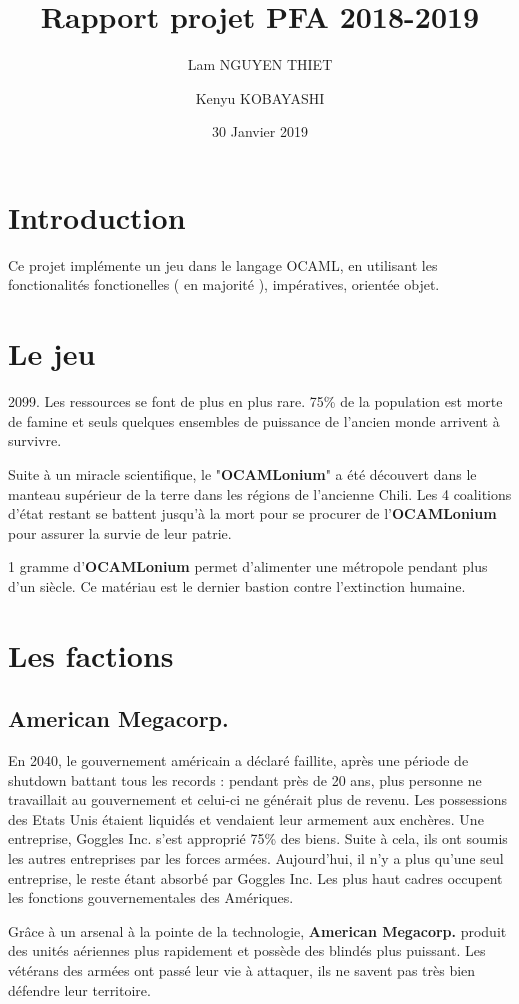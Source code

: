 \documentclass{article}
\title{Rapport projet PFA 2018-2019}
\date{30 Janvier 2019}
\author{Lam NGUYEN THIET
\and Kenyu KOBAYASHI}
\begin{document}
\maketitle
\section{Introduction}
Ce projet implémente un jeu dans le langage OCAML, en utilisant les fonctionalités fonctionelles ( en majorité ), impératives, orientée objet.
\section{Le jeu}
2099. Les ressources se font de plus en plus rare. 75\% de la population est morte de famine et seuls quelques ensembles de puissance de l'ancien monde arrivent
à survivre.

Suite à un miracle scientifique, le "\textbf{OCAMLonium}" a
été découvert dans le manteau supérieur de la terre dans
les régions de l'ancienne Chili. Les 4 coalitions d'état
restant se battent jusqu'à la mort pour se procurer de
l'\textbf{OCAMLonium} pour assurer la survie de leur patrie.

1 gramme d'\textbf{OCAMLonium} permet d'alimenter une métropole pendant plus
d'un siècle. Ce matériau est le dernier bastion contre
l'extinction humaine.

\section{Les factions}
\subsection{American Megacorp.}
En 2040, le gouvernement américain a déclaré faillite, après une période de shutdown battant tous les records : pendant près de 20 ans,
plus personne ne travaillait au gouvernement et celui-ci ne générait plus de revenu. Les possessions des Etats Unis étaient liquidés et vendaient leur armement aux
enchères. Une entreprise, Goggles Inc. s'est approprié 75\% des biens. Suite à cela, ils ont soumis les autres entreprises
par les forces armées. Aujourd'hui, il n'y a plus qu'une seul entreprise, le reste étant absorbé par Goggles Inc. Les plus haut cadres occupent
les fonctions gouvernementales des Amériques.

Grâce à un arsenal à la pointe de la technologie, \textbf{American Megacorp.} produit des unités aériennes plus rapidement
et possède des blindés plus puissant. Les vétérans des armées ont passé leur vie à attaquer, ils ne savent pas très bien
défendre leur territoire.
\end{document}
